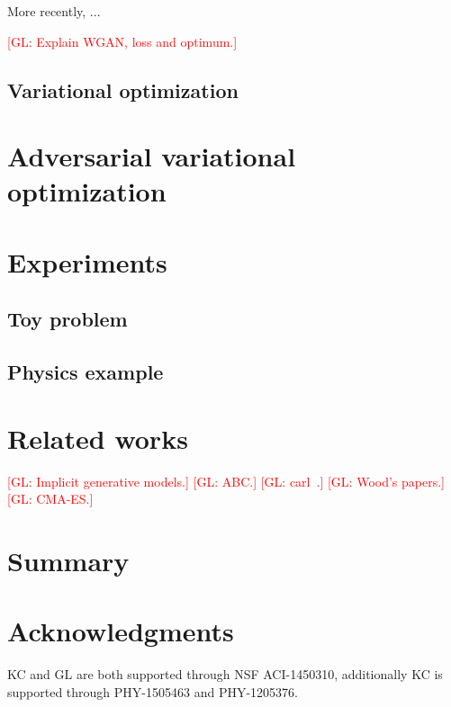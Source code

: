 \documentclass[twocolumn,superscriptaddress,aps]{revtex4-1}
\newcommand{\glnote}[1]{\textcolor{red}{[GL: #1]}}
\theoremstyle{plain}
\begin{document}
More recently, ...

\glnote{Explain WGAN, loss and optimum.}

\subsection{Variational optimization}



\section{Adversarial variational optimization}



\section{Experiments}

\subsection{Toy problem}

\subsection{Physics example}



\section{Related works}


\glnote{Implicit generative models.}
\glnote{ABC.}
\glnote{carl~\citep{cranmer2015approximating}.}
\glnote{Wood's papers.}
\glnote{CMA-ES.}



\section{Summary}




\section*{Acknowledgments}

KC and GL are both supported through NSF ACI-1450310, additionally KC is
supported through PHY-1505463 and PHY-1205376.





\end{document}
